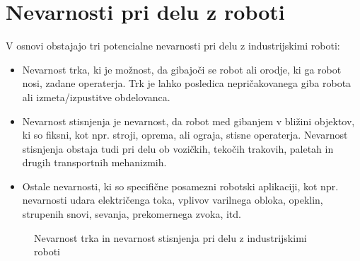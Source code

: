 \section{Nevarnosti pri delu z roboti}

V osnovi obstajajo tri potencialne nevarnosti pri delu z
industrijskimi roboti:
\begin{itemize}
    \item \vspace*{-0.1cm} Nevarnost trka, ki je možnost, da gibajoči se robot ali
    orodje, ki ga robot nosi, zadane operaterja. Trk je lahko posledica
    nepričakovanega giba robota ali izmeta/izpustitve
    obdelovanca.
    \item \vspace*{-0.1cm} Nevarnost stisnjenja je nevarnost, da robot med gibanjem v bližini objektov,
    ki so fiksni, kot npr. stroji, oprema, ali ograja, stisne
    operaterja. Nevarnost stisnjenja obstaja tudi pri delu ob
    vozičkih, tekočih trakovih, paletah in drugih
    transportnih mehanizmih.
    \item \vspace*{-0.1cm} Ostale nevarnosti, ki so specifične posamezni robotski aplikaciji, kot npr.
    nevarnosti
    udara električenga toka, vplivov varilnega obloka,
    opeklin, strupenih snovi, sevanja, prekomernega zvoka, itd.
\end{itemize}

\begin{figure}[h]
\centering
{}
\caption{\label{cop}Nevarnost trka in nevarnost stisnjenja pri
delu z industrijskimi roboti}
\end{figure}

